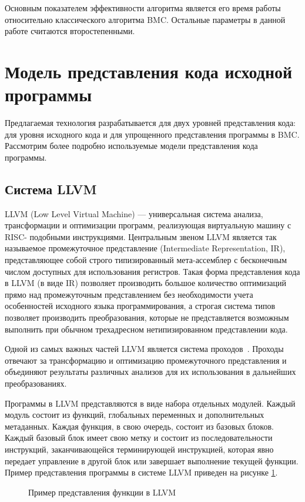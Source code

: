 Основным показателем эффективности алгоритма является его время работы 
относительно классического алгоритма BMC. Остальные параметры в данной работе
считаются второстепенными.

\section{Модель представления кода исходной программы}

Предлагаемая технология разрабатывается для двух уровней представления кода: 
для уровня исходного кода и для упрощенного представления программы в BMC.
Рассмотрим более подробно используемые модели представления кода программы.

\subsection{Система LLVM}
LLVM (Low Level Virtual Machine) --- универсальная система анализа, 
трансформации и оптимизации программ, реализующая виртуальную машину с RISC-
подобными инструкциями. Центральным звеном LLVM является так называемое 
промежуточное представление (Intermediate Representation, IR), представляющее 
собой строго типизированный мета-ассемблер с бесконечным числом доступных для 
использования регистров.  Такая форма представления кода в LLVM (в виде IR) 
позволяет производить большое количество оптимизаций прямо над промежуточным 
представлением без необходимости учета особенностей исходного языка 
программирования, а строгая система типов позволяет производить преобразования, 
которые не представляется возможным выполнить при обычном трехадресном
нетипизированном представлении кода.

Одной из самых важных частей LLVM является система проходов~\cite{llvmpass}. 
Проходы отвечают за трансформацию и оптимизацию промежуточного представления и 
объединяют результаты различных анализов для их использования в дальнейших 
преобразованиях.

Программы в LLVM представляются в виде набора отдельных модулей. Каждый модуль 
состоит из функций, глобальных переменных и дополнительных метаданных. Каждая 
функция, в свою очередь, состоит из базовых блоков. Каждый базовый блок имеет 
свою метку и состоит из последовательности инструкций, заканчивающейся 
терминирующей инструкцией, которая явно передает управление в другой блок или 
завершает выполнение текущей функции. Пример представления программы в системе 
LLVM приведен на рисунке \ref{image:llvmIR}.
\begin{figure}[h!]
\caption{Пример представления функции в LLVM}
\label{image:llvmIR}
\end{figure}
    
